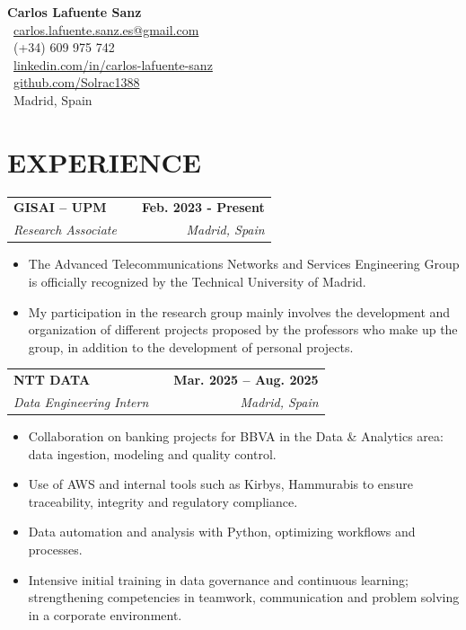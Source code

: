 \documentclass[a4paper,10pt]{article}
\makeatletter
\newcommand{\smallblacksquare}{\raisebox{0.4ex}{\rule{0.6ex}{0.6ex}}}
\newenvironment{joblong}[4]
{
	\begin{tabularx}{\linewidth}{@{}l X r@{}}
		\textbf{#1} & \hfill & \textbf{#2} \\
		\small\textit{#3} & \hfill & \small\textit{#4} \\[3.75pt]
	\end{tabularx}
	\begin{minipage}[t]{\linewidth}
		\begin{itemize}[nosep,after=\strut, leftmargin=1em, itemsep=3pt,label=\smallblacksquare]
		}
		{
		\end{itemize}
	\end{minipage}    
}
\makeatother
\begin{document}
	
	\pagestyle{empty} 
	
	
	\begin{flushleft}
		\Huge{\textbf{Carlos Lafuente Sanz}} \\[4pt]
		\vspace{4pt}
		\normalsize
		\faEnvelope \ \href{mailto:carlos.lafuente.sanz.es@gmail.com}{carlos.lafuente.sanz.es@gmail.com} \\
		\faMobile \ (+34) 609 975 742 \\
		\faLinkedin \ \href{https://linkedin.com/in/carlos-lafuente-sanz}{linkedin.com/in/carlos-lafuente-sanz} \\
		\faGithub \ \href{https://github.com/Solrac1388}{github.com/Solrac1388} \\
		\faHome \ Madrid, Spain
	\end{flushleft}
	\vspace{-10pt}
	\noindent\titlerule
	\vspace{8pt}
	
	
	\section{EXPERIENCE}
	
	\begin{joblong}{GISAI – UPM}{Feb. 2023 - Present}{Research Associate}{Madrid, Spain}
		\item The Advanced Telecommunications Networks and Services Engineering Group is officially recognized by the Technical University of Madrid.
		\item My participation in the research group mainly involves the development and organization of different projects proposed by the professors who make up the group, in addition to the development of personal projects.
	\end{joblong}
	
	\begin{joblong}{NTT DATA}{Mar. 2025 – Aug. 2025}{Data Engineering Intern}{Madrid, Spain}
		\item Collaboration on banking projects for BBVA in the Data \& Analytics area: data ingestion, modeling and quality control.
		\item Use of AWS and internal tools such as Kirbys, Hammurabis to ensure traceability, integrity and regulatory compliance.
		\item Data automation and analysis with Python, optimizing workflows and processes.
		\item Intensive initial training in data governance and continuous learning; strengthening competencies in teamwork, communication and problem solving in a corporate environment.
	\end{joblong}
	
\end{document}
